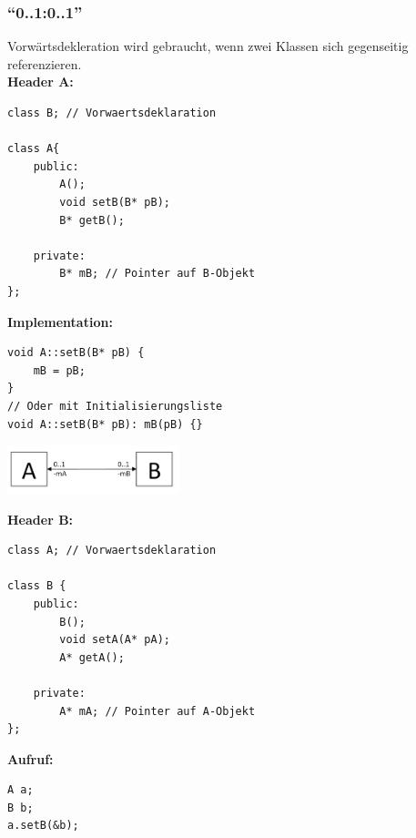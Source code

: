 \subsubsection{"`0..1:0..1"'}
\begin{multicols}{2}
Vorwärtsdekleration wird gebraucht, wenn zwei Klassen sich gegenseitig referenzieren. \\

\textbf{Header A:}
\begin{lstlisting}
class B; // Vorwaertsdeklaration

class A{
	public:
	    A();
		void setB(B* pB);
		B* getB();
		
	private:
		B* mB; // Pointer auf B-Objekt
};
\end{lstlisting}

\textbf{Implementation:}
\begin{lstlisting}
void A::setB(B* pB) {
	mB = pB;
}
// Oder mit Initialisierungsliste
void A::setB(B* pB): mB(pB) {}
\end{lstlisting}

\columnbreak
\includegraphics[width=5cm]{./bilder/Assozi_01_01.png}

\textbf{Header B:}
\begin{lstlisting}
class A; // Vorwaertsdeklaration

class B {	
	public:
		B();
		void setA(A* pA);
		A* getA();
		
	private: 
		A* mA; // Pointer auf A-Objekt
};
\end{lstlisting}

\textbf{Aufruf:}
\begin{lstlisting}
A a;
B b;
a.setB(&b);
\end{lstlisting}
\end{multicols}

